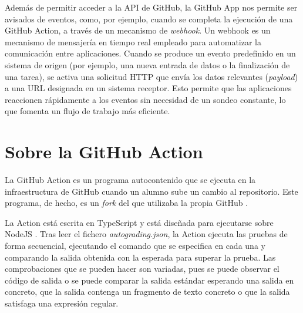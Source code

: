 Además de permitir acceder a la API de GitHub, la GitHub App nos permite ser avisados de eventos, como, por ejemplo, cuando se completa la ejecución de una GitHub Action, a través de un mecanismo de \textit{webhook}. Un webhook es un mecanismo de mensajería en tiempo real empleado para automatizar la comunicación entre aplicaciones. Cuando se produce un evento predefinido en un sistema de origen (por ejemplo, una nueva entrada de datos o la finalización de una tarea), se activa una solicitud \acrshort{HTTP} que envía los datos relevantes (\textit{payload}) a una \acrshort{URL} designada en un sistema receptor. Esto permite que las aplicaciones reaccionen rápidamente a los eventos sin necesidad de un sondeo constante, lo que fomenta un flujo de trabajo más eficiente.\cite{redhatWhatWebhook}

\section{Sobre la GitHub Action}
La GitHub Action es un programa autocontenido que se ejecuta en la infraestructura de GitHub cuando un alumno sube un cambio al repositorio. Este programa, de hecho, es un \textit{fork} del que utilizaba la propia GitHub \cite{githubGitHubEducationautograding}.

La Action está escrita en TypeScript \cite{typescript} y está diseñada para ejecutarse sobre NodeJS \cite{nodejs}. Tras leer el fichero \textit{autograding.json}, la Action ejecuta las pruebas de forma secuencial, ejecutando el comando que se especifica en cada una y comparando la salida obtenida con la esperada para superar la prueba. Las comprobaciones que se pueden hacer son variadas, pues se puede observar el código de salida \cite{exitcode} o se puede comparar la salida estándar esperando una salida en concreto, que la salida contenga un fragmento de texto concreto o que la salida satisfaga una expresión regular.

